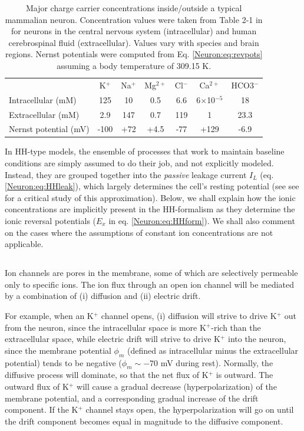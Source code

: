 \begin{table}[h]
\caption[Hva betyr dette]{Major charge carrier concentrations inside/outside a typical mammalian neuron. Concentration values were taken from Table 2-1 in \cite{Somjenboka} for neurons in the central nervous system  (intracellular) and human cerebrospinal fluid (extracellular). Values vary with species and brain regions. Nernst potentials were computed from Eq. \ref{Neuron:eq:revpots} assuming a body temperature of 309.15 K.}
\label{Neuron:tab:ion-concentrations}
\begin{tabular}{@{}lcccccc@{}}
					& 	K$^+$	&	Na$^+$	&	Mg$^{2+}$	  &	Cl$^-$	&	Ca$^{2+}$	 	& HCO3$^-$ 	\\ 
Intracellular (mM)				    & 125		&		10	&		0.5	&	6.6		&  	6$\times$10$^{-5}$	  & 	18 \\
Extracellular (mM)			           & 2.9			&		147	&		0.7	&	119 		&		1	&	23.3	  	\\
Nernst potential (mV)		    &	-100		&	    	+72	&		+4.5	&	-77		&		+129 	& 	-6.9  	\\
\end{tabular}{}
\end{table}

In HH-type models, the ensemble of processes that work to maintain baseline conditions are simply assumed to do their job, and not explicitly modeled. Instead, they are grouped together into the \textit{passive} leakage current $I_L$ (eq. \ref{Neuron:eq:HHleak}), which largely determines the cell's resting potential (see see \cite{offner1991} for a critical study of this approximation). Below, we shall explain how the ionic concentrations are implicitly present in the HH-formalism as they determine the ionic reversal potentials ($E_x$ in eq. \ref{Neuron:eq:HHform}). We shall also comment on the cases where the assumptions of constant ion concentrations are not applicable. 


\subsection{}
\label{sec:Neuron:Erev}
Ion channels are pores in the membrane, some of which are selectively permeable only to specific ions. The ion flux through an open ion channel will be mediated by a combination of (i) diffusion and (ii) electric drift. 

For example, when an K$^+$ channel opens, (i) diffusion will strive to drive K$^+$ out from the neuron, since the intracellular space is more K$^+$-rich than the extracellular space, while electric drift will strive to drive K$^+$ into the neuron, since the membrane potential $\phi_m$ (defined as intracellular minus the extracellular potential) tends to be negative ($\phi_m \sim - 70$  mV during rest). Normally, the diffusive process will dominate, so that the net flux of K$^+$ is outward. The outward flux of K$^+$ will cause a gradual decrease (hyperpolarization) of the membrane potential,  and a corresponding gradual increase of the drift component. If the K$^+$ channel stays open, the hyperpolarization will go on until the drift component becomes equal in magnitude to the diffusive component. 

